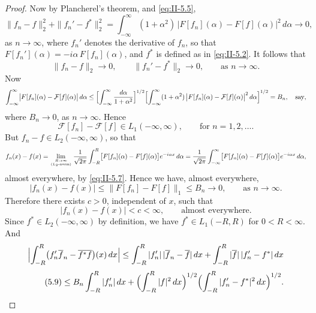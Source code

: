 \begin{proof}
Now by Plancherel's theorem, and \eqref{eq:II-5.5},
\[
\|f_{n}-f\|_{2}^{2}+\|f_{n}'-f^{*}\|_{2}^{2}
=\int_{-\infty}^{\infty}(1+\alpha^{2})\,
\bigl|F[f_{n}](\alpha)-F[f](\alpha)\bigr|^{2}\,d\alpha\to 0,
\]
as $n\to\infty$, where $f_{n}'$ denotes the derivative of $f_{n}$, so that $F[f_{n}'](\alpha)=-i\alpha\,F[f_{n}](\alpha)$, and $f^{*}$ is defined as in \eqref{eq:II-5.2}. It follows that
\begin{equation}\tag{5.6}\label{eq:II-5.6}
\|f_{n}-f\|_{2}\to 0,\qquad \|f_{n}'-f^{*}\|_{2}\to 0,\qquad\text{as }n\to\infty.
\end{equation}
Now
\[
\int_{-\infty}^{\infty}\bigl|F[f_{n}](\alpha)-\mathcal F[f](\alpha)\bigr|\,d\alpha
\le \Bigl[\int_{-\infty}^{\infty}\frac{d\alpha}{1+\alpha^{2}}\Bigr]^{1/2}
\Bigl[\int_{-\infty}^{\infty}(1+\alpha^{2})\,
\bigl|F[f_{n}](\alpha)-\mathcal F[f](\alpha)\bigr|^{2}\,d\alpha\Bigr]^{1/2}
=B_{n},\quad\text{say},
\]
where $B_{n}\to 0$, as $n\to\infty$. Hence
\begin{equation}\tag{5.7}\label{eq:II-5.7}
\mathcal F[f_{n}]-\mathcal F[f]\in L_{1}(-\infty,\infty),\qquad\text{for }n=1,2,\dots.
\end{equation}
But $f_{n}-f\in L_{2}(-\infty,\infty)$, so that
\[
f_{n}(x)-f(x)=\lim_{R\to\infty\atop(L_{2}\text{-norm})}
\frac{1}{\sqrt{2\pi}}\int_{-R}^{R}\bigl[F[f_{n}](\alpha)-F[f](\alpha)\bigr]e^{-i\alpha x}\,d\alpha
=\frac{1}{\sqrt{2\pi}}\int_{-\infty}^{\infty}\bigl[F[f_{n}](\alpha)-F[f](\alpha)\bigr]e^{-i\alpha x}\,d\alpha,
\]
almost everywhere, by \eqref{eq:II-5.7}. Hence we have, almost everywhere,
\begin{equation}\tag{5.7'}\label{eq:II-5.7p}
|f_{n}(x)-f(x)|\le \|F[f_{n}]-F[f]\|_{1}\le B_{n}\to 0,\qquad\text{as }n\to\infty.
\end{equation}
Therefore there exists $c>0$, independent of $x$, such that
\begin{equation}\tag{5.8}\label{eq:II-5.8}
|f_{n}(x)-f(x)|<c<\infty,\qquad\text{almost everywhere}.
\end{equation}
Since $f^{*}\in L_{2}(-\infty,\infty)$ by definition, we have $f^{*}\in L_{1}(-R,R)$ for $0<R<\infty$. And
\[
\Bigl|\int_{-R}^{R}\bigl(f_{n}'\overline{f}_{n}-\overline{f^{*}}\overline{f}\bigr)(x)\,dx\Bigr|
\le\int_{-R}^{R}|f_{n}'|\,|\overline{f}_{n}-\overline{f}|\,dx
+\int_{-R}^{R}|\overline{f}|\,|f_{n}'-f^{*}|\,dx
\]
\begin{equation}\tag{5.9}\label{eq:II-5.9}
\le B_{n}\int_{-R}^{R}|f_{n}'|\,dx
+\Bigl(\int_{-R}^{R}|f|^{2}\,dx\Bigr)^{1/2}
\Bigl(\int_{-R}^{R}|f_{n}'-f^{*}|^{2}\,dx\Bigr)^{1/2}.

\end{equation}
\end{proof}
